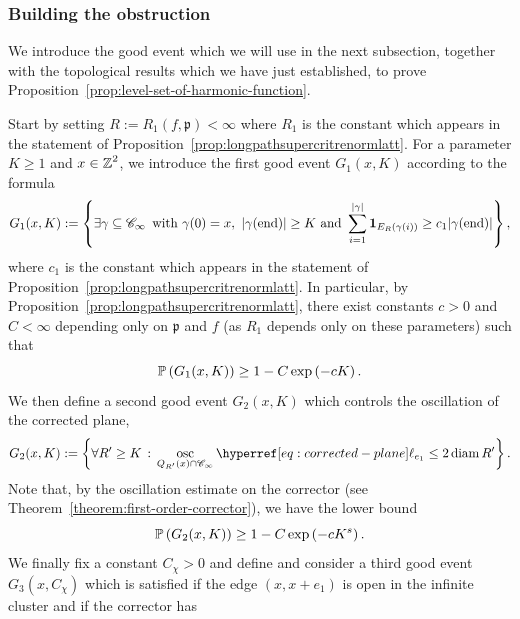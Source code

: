 \documentclass[12pt]{amsart}
\numberwithin{equation}{section}
\begin{document}
	
	
	\subsubsection{Building the obstruction} \label{subsubsec:building-the-obstruction}
	We introduce the good event which we will use in the next subsection, together with the 
	topological results which we have just established, to prove Proposition~\ref{prop:level-set-of-harmonic-function}.
	
	Start by setting $R := R_1(f , \mathfrak{p}) < \infty$ where $R_1$ is the constant which appears in the statement of Proposition~\ref{prop:longpathsupercritrenormlatt}. For a parameter $K \geq 1$ and $x \in \Z^2$, we introduce the first good event $G_1(x , K)$ according to the formula
	\begin{equation} \label{eq:defG1}
		G_1(x , K)  := \left\{ \exists \gamma \subseteq \mathscr{C}_\infty \, \mbox{ with } \gamma(0) = x ,~  \left| \gamma(\mathrm{end}) \right| \geq K ~\mbox{and}~ \sum_{i = 1}^{|\gamma|} \indc_{E_R \left( \gamma(i) \right)} \geq c_1 | \gamma(\mathrm{end}) | \right\},  
	\end{equation}
	where $c_1$ is the constant which appears in the statement of Proposition~\ref{prop:longpathsupercritrenormlatt}. In particular, by Proposition~\ref{prop:longpathsupercritrenormlatt}, there exist constants $c > 0$ and $C < \infty$ depending only on $\mathfrak{p}$ and $f$ (as $R_1$ depends only on these parameters) such that
	\begin{equation} \label{eq:PG1goesto1}
		\P \left( G_1(x , K) \right) \geq 1 - C \exp \left( - c K \right).
	\end{equation}
	We then define a second good event $G_2(x , K)$ which controls the oscillation of the corrected plane,
	\begin{equation} \label{eq:corrector-oscillation}
		G_2(x,K) := \left\{ \forall R' \geq  K \, : \, \osc_{Q_{R'}(x) \cap \mathscr{C}_{\infty}} \ellp{e_1} \leq 2 \diam R' \right\}.
	\end{equation}
	Note that, by the oscillation estimate on the corrector (see Theorem~\ref{theorem:first-order-corrector}), we have the lower bound
	\begin{equation} \label{eq:PG2goesto1}
		\P \left( G_2(x,K) \right) \geq 1 - C \exp \left( - c K^s \right).
	\end{equation}
	We finally fix a constant $C_\chi > 0$ and define and consider a third good event $G_3 (x , C_{\chi})$ which is satisfied if the edge $(x, x+e_1)$ is open in the infinite cluster and if the corrector has
\end{document}
